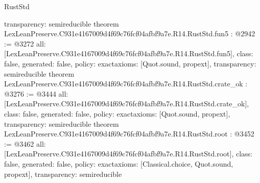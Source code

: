 \begin{lexlean}{RustStd}
\begin{coremodule}
{  transparency: semireducible
}
theorem LexLeanPreserve.C931e4167009d4f69c76fcf04afbf9a7e.R14.RustStd.fun5 : @2942 := @3272 {
  all: [LexLeanPreserve.C931e4167009d4f69c76fcf04afbf9a7e.R14.RustStd.fun5],
  class: false,
  generated: false,
  policy: exact{axioms: [Quot.sound, propext]},
  transparency: semireducible
}
theorem LexLeanPreserve.C931e4167009d4f69c76fcf04afbf9a7e.R14.RustStd.crate_ok : @3276 := @3444 {
  all: [LexLeanPreserve.C931e4167009d4f69c76fcf04afbf9a7e.R14.RustStd.crate_ok],
  class: false,
  generated: false,
  policy: exact{axioms: [Quot.sound, propext]},
  transparency: semireducible
}
theorem LexLeanPreserve.C931e4167009d4f69c76fcf04afbf9a7e.R14.RustStd.root : @3452 := @3462 {
  all: [LexLeanPreserve.C931e4167009d4f69c76fcf04afbf9a7e.R14.RustStd.root],
  class: false,
  generated: false,
  policy: exact{axioms: [Classical.choice, Quot.sound, propext]},
  transparency: semireducible
}


\end{coremodule}
\end{lexlean}
